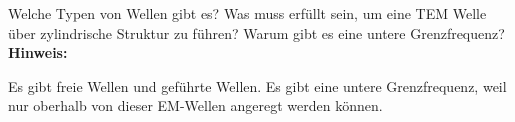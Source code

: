 \begin{question}[section=5,subsection=52,name={Typen von Wellen},difficulty=5,type=mdl,mode=exm,tags={}]
	Welche Typen von Wellen gibt es? Was muss erfüllt sein, um eine TEM Welle über zylindrische Struktur zu führen?
	Warum gibt es eine untere Grenzfrequenz?
	\\ \textbf{Hinweis:}\\
	
\end{question}
\begin{solution}
	Es gibt freie Wellen und geführte Wellen. Es gibt eine untere Grenzfrequenz, weil nur oberhalb von dieser EM-Wellen angeregt werden können.
\end{solution}